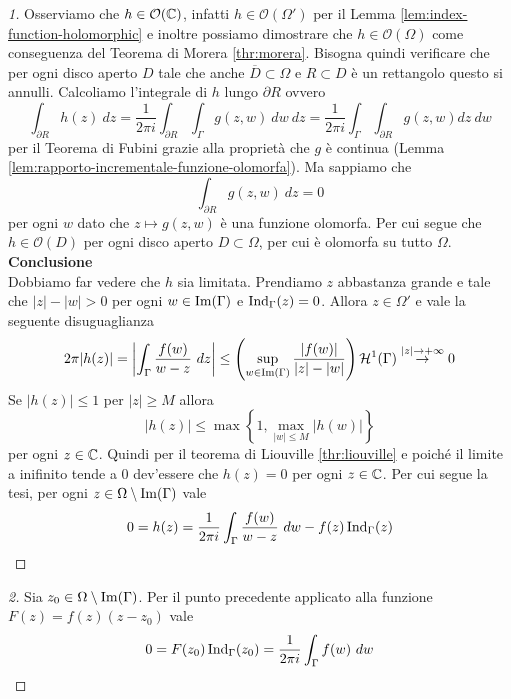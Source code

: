 \begin{proof}[1]
    Osserviamo che $h \in \mathcal{O}(\mathbb{C})$, infatti $h \in
    \mathcal{O}(\Omega')$ per il Lemma \ref{lem:index-function-holomorphic}
    e inoltre possiamo dimostrare che $h \in \mathcal{O}(\Omega)$ come
    conseguenza del Teorema di Morera \ref{thr:morera}. 
    Bisogna quindi verificare che per ogni disco aperto $D$ tale che anche 
    $\overline{D}\subset \Omega$ e $R \subset D$ è un rettangolo questo si
    annulli. Calcoliamo l'integrale di $h$ lungo $\partial R$ ovvero 
    \begin{equation*}
      \int_{\partial R} h(z)\ dz = \frac{1}{2\pi i} \int_{\partial
      R}\int_\Gamma g(z,w)\ dw\ dz = \frac{1}{2\pi i} \int_\Gamma
      \int_{\partial R} g(z,w) dz\ dw
    \end{equation*}
    per il Teorema di Fubini grazie alla proprietà che $g$ è continua (Lemma
    \ref{lem:rapporto-incrementale-funzione-olomorfa}). Ma sappiamo che 
    \begin{equation*}
      \int_{\partial R} g(z,w) \ dz = 0  
    \end{equation*}
    per ogni $w$ dato che $z \mapsto g(z,w)$ è una funzione olomorfa. Per
    cui segue che $h \in \mathcal{O}(D)$ per ogni disco aperto $D \subset
    \Omega$, per cui è olomorfa su tutto $\Omega$.\\

    \textbf{Conclusione}\\

    Dobbiamo far vedere che $h$ sia limitata. Prendiamo $z$ abbastanza
    grande e tale che $|z| - |w| > 0$ per ogni $w \in \operatorname{Im}(\Gamma)$
    e $\operatorname{Ind}_\Gamma(z) = 0$. Allora $z \in \Omega'$ e vale la
    seguente disuguaglianza
    \begin{equation*}
      2\pi |h(z)| = \left|\int_\Gamma \frac{f(w)}{w-z}\ dz \right| \le
      \left( \sup_{w \in \operatorname{Im}(\Gamma)} \frac{|f(w)|}{|z|-|w|} \right)
        \mathcal{H}^1(\Gamma) \overset{|z|\to+\infty}{\to} 0
    \end{equation*}
    Se $|h(z)| \le 1$ per $|z| \ge M$ allora 
    \begin{equation*}
      |h(z)| \le \max \left\{1,\max_{|w| \le M} |h(w)|\right\}
    \end{equation*}
    per ogni $z \in \mathbb{C}$. Quindi per il teorema di Liouville
    \ref{thr:liouville} e poiché il limite a inifinito tende a $0$
    dev'essere che $h(z) = 0$ per ogni $z \in \mathbb{C}$. Per cui segue la tesi, 
    per ogni $z \in \Omega \setminus \operatorname{Im}(\Gamma)$ vale 
    \begin{equation*}
      0 = h(z) = \frac{1}{2 \pi i} \int_\Gamma \frac{f(w)}{w-z}\ dw - f(z)
      \operatorname{Ind}_\Gamma(z)  
    \end{equation*}
\end{proof}
\begin{proof}[2]
  Sia $z_0 \in \Omega \setminus \operatorname{Im}(\Gamma)$. Per il punto precedente
    applicato alla funzione $F(z) = f(z)(z-z_0)$ vale
    \begin{equation*}
      0 = F(z_0)\operatorname{Ind}_\Gamma(z_0) = \frac{1}{2 \pi i}
      \int_\Gamma f(w)\ dw
    \end{equation*}
\end{proof}

